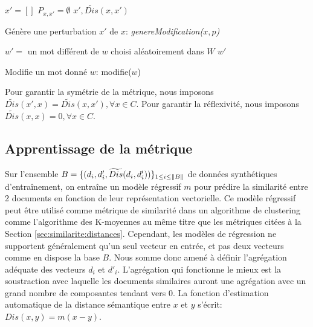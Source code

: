 \begin{algorithm}[!htb] %
 ${x'} = [] $\; 
 $P_{x,x'} = \emptyset$\;
 \Return $x', \widetilde{Dis}(x,x')$\;
 \caption{Génère une perturbation $x'$ de $x$: \textit{genereModification($x, p$)}} \label{algo:similarite:perturbation}
\end{algorithm}


\begin{algorithm}[H]
 $w' = $ un mot différent de $w$ choisi aléatoirement dans $W$\;
 \Return $w'$
 \caption{Modifie un mot donné $w$: modifie($w$)} \label{algo:similarite:modifiemot}
\end{algorithm}

Pour garantir la symétrie de la métrique, nous imposons $\widetilde{Dis}(x', x) = \widetilde{Dis}(x, x'), \forall x \in C$. Pour garantir la réflexivité, nous imposons $\widetilde{Dis}(x, x) = 0, \forall x \in C$.

\subsection{Apprentissage de la métrique}

Sur l'ensemble $B = \lbrace (d_i, d'_i, \widetilde{Dis}(d_i, d'_i))\rbrace_{1 \leq i \leq \left\lVert B\right\rVert}$ de données synthétiques d'entraînement, on entraîne un modèle régressif $m$ pour prédire la similarité entre 2 documents en fonction de leur représentation vectorielle. Ce modèle régressif peut être utilisé comme métrique de similarité dans un algorithme de clustering comme l'algorithme des K-moyennes au même titre que les métriques citées à la Section \ref{sec:similarite:distances}. Cependant, les modèles de régression ne supportent généralement qu'un seul vecteur en entrée, et pas deux vecteurs comme en dispose la base $B$. Nous somme donc amené à définir l'agrégation adéquate des vecteurs $d_i$ et $d'_i$. L'agrégation qui fonctionne le mieux est la soustraction avec laquelle les documents similaires auront une agrégation avec un grand nombre de composantes tendant vers 0. La fonction d'estimation automatique de la distance sémantique entre $x$ et $y$ s'écrit: $Dis(x, y) = m(x-y)$. 

